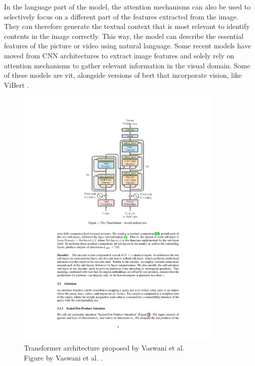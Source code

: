     
    In the language part of the model, the attention mechanisms can also be used to selectively focus on a different part of the features extracted from the image. They can therefore generate the textual context that is most relevant to identify contents in the image correctly. This way, the model can describe the essential features of the picture or video using natural language. Some recent models have moved from CNN architectures to extract image features and solely rely on attention mechanisms to gather relevant information in the visual domain. Some of these models are \gls{vit}, alongside versions of \gls{bert} that incorporate vision, like ViBert \cite{leiLessMoreClipBERT2021, liVisualBERTSimplePerformant2019, suVLBERTPretrainingGeneric2020}. %

    
    \begin{figure}[htb]
        \centering
        \centerline{
        \includegraphics[width=10cm]{images/Transformer_architecture}}
        \caption[Figure of the transformer architecture.]{Transformer architecture proposed by Vaswani et al.\\
        Figure by Vaswani et al. \cite{vaswaniAttentionAllYou2017}.}
        \label{fig:transformer_architecture}
    \end{figure}


